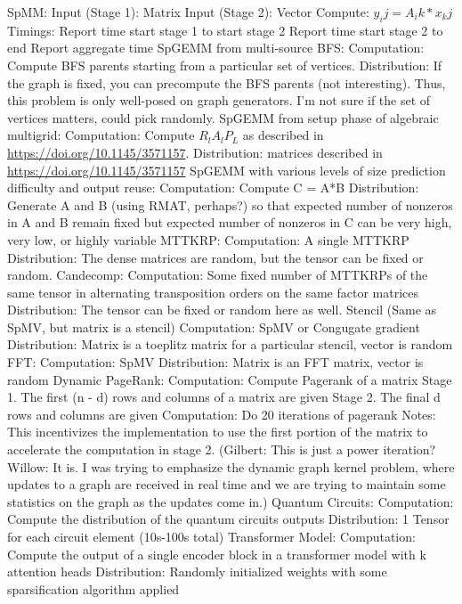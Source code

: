 \documentclass{article}
\begin{document}
SpMM:
	Input (Stage 1):
		Matrix
	Input (Stage 2):
		Vector
	Compute:
		$y_ij = A_ik * x_kj$
	Timings:
Report time start stage 1 to start stage 2
Report time start stage 2 to end
Report aggregate time
SpGEMM from multi-source BFS:
	Computation: Compute BFS parents starting from a particular set of vertices.
	Distribution: If the graph is fixed, you can precompute the BFS parents (not interesting). Thus, this problem is only well-posed on graph generators. I’m not sure if the set of vertices matters, could pick randomly.
SpGEMM from setup phase of algebraic multigrid:
	Computation: Compute $R_lA_lP_L$ as described in \url{https://doi.org/10.1145/3571157}.
	Distribution: matrices described in \url{https://doi.org/10.1145/3571157}
SpGEMM with various levels of size prediction difficulty and output reuse:
	Computation: Compute C = A*B
	Distribution: Generate A and B (using RMAT, perhaps?) so that expected number of nonzeros in A and B remain fixed but expected number of nonzeros in C can be very high, very low, or highly variable
MTTKRP:
	Computation: A single MTTKRP 
	Distribution: The dense matrices are random, but the tensor can be fixed or random.
Candecomp:
	Computation: Some fixed number of MTTKRPs of the same tensor in alternating transposition orders on the same factor matrices
	Distribution: The tensor can be fixed or random here as well.
Stencil (Same as SpMV, but matrix is a stencil)
	Computation: SpMV or Congugate gradient
	Distribution: Matrix is a toeplitz matrix for a particular stencil, vector is random
FFT:
	Computation: SpMV
	Distribution: Matrix is an FFT matrix, vector is random
Dynamic PageRank:
	Computation: Compute Pagerank of a matrix
	Stage 1.
		The first (n - d) rows and columns of a matrix are given
	Stage 2.
		The final d rows and columns are given
	Computation:
		Do 20 iterations of pagerank
	Notes: This incentivizes the implementation to use the first portion of the matrix to accelerate the computation in stage 2.
(Gilbert: This is just a power iteration? Willow: It is. I was trying to emphasize the dynamic graph kernel problem, where updates to a graph are received in real time and we are trying to maintain some statistics on the graph as the updates come in.)
Quantum Circuits:
	Computation: Compute the distribution of the quantum circuits outputs
	Distribution: 1 Tensor for each circuit element (10s-100s total)
Transformer Model:
	Computation: Compute the output of a single encoder block in a transformer model with k attention heads
	Distribution: Randomly initialized weights with some sparsification algorithm applied
 
\end{document}
